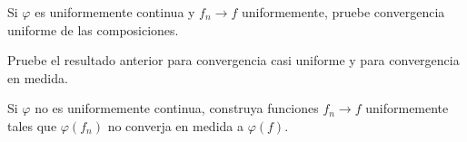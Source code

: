 \begin{ejercicio}\label{ej:v2-l15-6}
Si $\varphi$ es uniformemente continua y $f_n\to f$ uniformemente, pruebe convergencia uniforme de las composiciones.
\end{ejercicio}

\begin{ejercicio}\label{ej:v2-l15-7}
Pruebe el resultado anterior para convergencia casi uniforme y para convergencia en medida.
\end{ejercicio}

\begin{ejercicio}\label{ej:v2-l15-8}
Si $\varphi$ no es uniformemente continua, construya funciones $f_n\to f$ uniformemente tales que $\varphi(f_n)$ no converja en medida a $\varphi(f)$.
\end{ejercicio}
